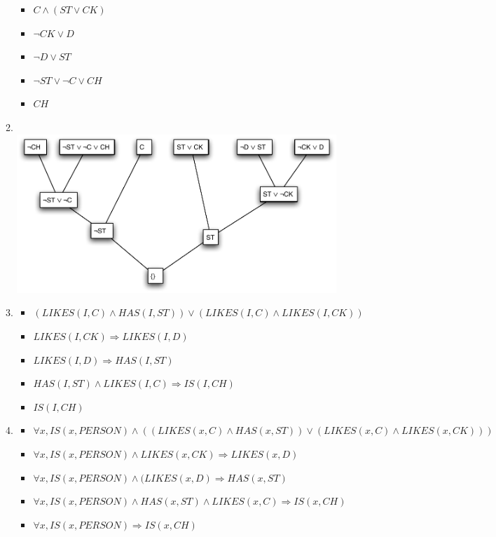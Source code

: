 \documentclass[10pt]{article}
\begin{document}
\begin{enumerate}
\begin{enumerate}
\begin{itemize}
    \item $C \land (ST \lor CK)$
    \item $\lnot CK \lor D$
    \item $\lnot D \lor ST$
    \item $\lnot ST \lor \lnot C \lor CH$
    \item $CH$
    \end{itemize}
  \item %
    \ \\
    \includegraphics[width=5.5in]{4c_proof.pdf}
  \item %
    \begin{itemize}
    \item $(LIKES(I, C) \land HAS(I, ST)) \lor (LIKES(I,C) \land LIKES(I,CK))$
    \item $LIKES(I,CK) \Rightarrow LIKES(I,D)$
    \item $LIKES(I,D) \Rightarrow HAS(I,ST)$
    \item $HAS(I,ST) \land LIKES(I,C) \Rightarrow IS(I,CH)$
    \item $IS(I,CH)$
    \end{itemize}
  \item %
    \begin{itemize}
    \item $\forall x, IS(x, PERSON) \land 
                      ((LIKES(x, C) \land HAS(x, ST)) \lor 
                       (LIKES(x,C) \land LIKES(x,CK)))$
    \item $\forall x, IS(x, PERSON) \land LIKES(x,CK) \Rightarrow LIKES(x,D)$
    \item $\forall x, IS(x, PERSON) \land (LIKES(x,D) \Rightarrow HAS(x,ST)$
    \item $\forall x, IS(x, PERSON) \land HAS(x,ST) \land LIKES(x,C) 
                      \Rightarrow IS(x,CH)$
    \item $\forall x, IS(x, PERSON) \Rightarrow IS(x,CH)$
    \end{itemize}
  \end{enumerate}
\end{enumerate}
\end{document}
